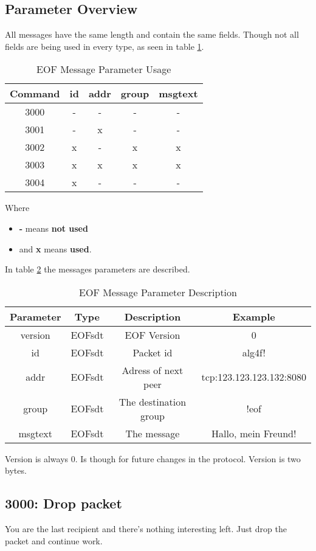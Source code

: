 \subsection{Parameter Overview}
All messages have the same length and contain the same fields.
Though not all fields are being used in every type, as seen in table
\ref{eofmessageparameteroverview}.
\begin{longtable}{|c|c|c|c|c|}
\caption{EOF Message Parameter Usage}
\label{eofmessageparameteroverview}
\\
\hline
\textbf{Command} & \textbf{id} & \textbf{addr} & \textbf{group} & \textbf{msgtext}\\
\hline
3000 & - & - & - & - \\
\hline
3001 & - & x & - & - \\
\hline
3002 & x & - & x & x \\
\hline
3003 & x & x & x & x \\
\hline
3004 & x & - & - & -\\
\hline
\end{longtable}
Where 
\begin{itemize}
\item \textbf{-} means \textbf{not used}
\item and \textbf{x} means \textbf{used}.
\end{itemize}
In table \ref{eofmessagedescription} the messages
parameters are described.
\begin{longtable}{|c|c|c|c|}
\caption{EOF Message Parameter Description}
\label{eofmessagedescription}
\\
\hline
\textbf{Parameter} & \textbf{Type} & \textbf{Description} & \textbf{Example}\\
\hline
version & EOFsdt & EOF Version & 0\\
\hline
id & EOFsdt & Packet id & alg4f!\\
\hline
addr & EOFsdt & Adress of next peer & tcp:123.123.123.132:8080\\
\hline
group & EOFsdt & The destination group & !eof\\
\hline
msgtext & EOFsdt & The message & Hallo, mein Freund!\\
\hline
\end{longtable}
Version is always 0. Is though for future changes in the protocol.
Version is two bytes.
\subsection{3000: Drop packet}
You are the last recipient and there's nothing interesting left.
Just drop the packet and continue work.
